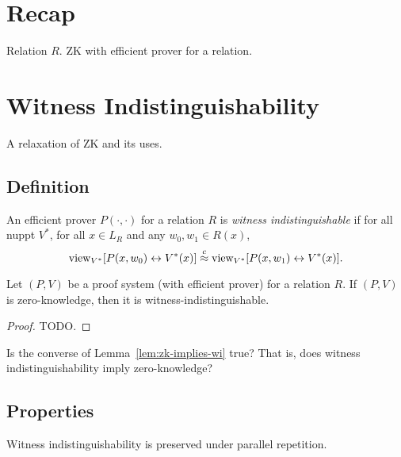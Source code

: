 \documentclass[11pt]{article}
\begin{document}
\thispagestyle{fancy}          %


\section{Recap}
\label{sec:recap}

Relation $R$.  ZK with efficient prover for a relation.

\section{Witness Indistinguishability}
\label{sec:witn-indist}

A relaxation of ZK and its uses.

\subsection{Definition}
\label{sec:definition}

\begin{definition}
  \label{def:wi}
  An efficient prover $P(\cdot,\cdot)$ for a relation $R$ is
  \emph{witness indistinguishable} if for all nuppt $V^{*}$, for all
  $x \in L_{R}$ and any $w_{0}, w_{1} \in R(x)$, \[
  \text{view}_{V^{*}}[P(x,w_{0}) \leftrightarrow V^{*}(x)] \stackrel{c}{\approx}
  \text{view}_{V^{*}}[P(x,w_{1}) \leftrightarrow V^{*}(x)]. \]
\end{definition}

\begin{lemma}
  \label{lem:zk-implies-wi}
  Let $(P,V)$ be a proof system (with efficient prover) for a relation
  $R$.  If $(P,V)$ is zero-knowledge, then it is
  witness-indistinguishable.
\end{lemma}

\begin{proof}
  TODO.
\end{proof}

Is the converse of Lemma~\ref{lem:zk-implies-wi} true?  That is, does
witness indistinguishability imply zero-knowledge?

\subsection{Properties}
\label{sec:properties}

\begin{lemma}
  \label{lem:wi-parallel}
  Witness indistinguishability is preserved under parallel repetition.
\end{lemma}
\end{document}
